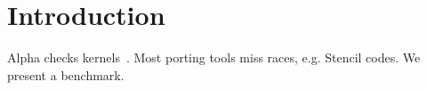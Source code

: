 \section{Introduction}
Alpha checks kernels~\cite{Alpha2024}. Most porting tools miss races, e.g. Stencil codes.
We present a benchmark.
